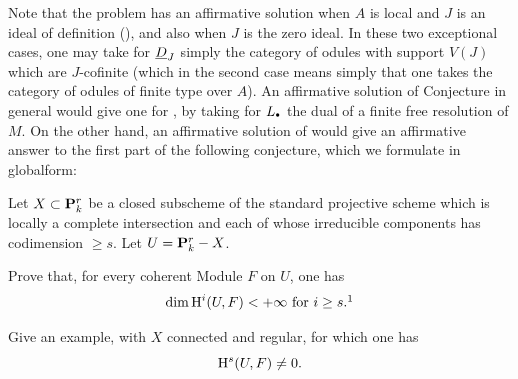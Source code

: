 Note that the problem has an affirmative solution when $A$ is local and $J$ is an ideal of definition (\cf \Exp {}), and also when $J$ is the zero ideal. In these two exceptional cases, one may take for ${\underline{D}_J}$ simply the category of odules with support $V(J)$ which are $J$-cofinite (which in the second case means simply that one takes the category of odules of finite type over $A$). An affirmative solution of Conjecture  in general would give one for , by taking for $L_{\boule}$ the dual of a finite free resolution of $M$. On the other hand, an affirmative solution of  would give an affirmative answer to the first part of the following conjecture, which we formulate in \og global\fg form:

\begin{conjecture} \label{XIII.1.3}
Let $X\subset \mathbf P^r_k$ be a closed subscheme of the standard projective scheme which is locally a complete intersection and each of whose irreducible components has codimension $\ge s$. Let $U=\mathbf P^r_k -X$.
\begin{enumeratei}
\item
Prove that, for every coherent Module $F$ on $U$, one has
$$
\dim \H^i(U, F)<+\infty{\rm \ for\ } i\ge s.{}\sfootnote{Part\sisi{}{ie} (i) of this conjecture was proved by R.~\sisi{HARTSHORNE}{Hartshorne} when $\sisi{Y}{X}$ is smooth \sisi{in \emph{Ample Vector Bundles}, Pub. Math. \numero 29, (1966)}{\cf \emph{Ample subvarieties of algebraic varieties}, Notes written in collaboration with C\ptbl Musili, Lect. Notes in Math, vol.~156, Springer-Verlag, Berlin-New York, 1970, Theorem III.5.2}. This author also found an example for (ii), \cf \sisi{R.~HARTSHORNE, \emph{Cohomological dimension of algebraic varieties}, forthcoming in the Ann. of Math.}{R.~Hartshorne, {\og Cohomological dimension of algebraic varieties\fg}, \emph{Ann. of Math. (2)} \textbf{88} (1968), p\ptbl 403--450, example on page 449.}}
$$

\item
Give an example, with $X$ connected and regular, for which one has
$$
\mathrm H^s(U, F)\neq 0.
$$
\end{enumeratei}
\end{conjecture}

